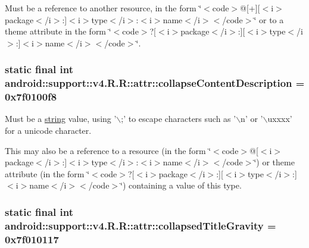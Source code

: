Must be a reference to another resource, in the form \char`\"{}$<$code$>$@\mbox{[}+\mbox{]}\mbox{[}$<$i$>$package$<$/i$>$:\mbox{]}$<$i$>$type$<$/i$>$:$<$i$>$name$<$/i$>$$<$/code$>$\char`\"{} or to a theme attribute in the form \char`\"{}$<$code$>$?\mbox{[}$<$i$>$package$<$/i$>$:\mbox{]}\mbox{[}$<$i$>$type$<$/i$>$:\mbox{]}$<$i$>$name$<$/i$>$$<$/code$>$\char`\"{}. \hypertarget{classandroid_1_1support_1_1v4_1_1_r_1_1attr_1a12539605c158306b97b48f25f27a3f}{
\subsubsection[{collapseContentDescription}]{\setlength{\rightskip}{0pt plus 5cm}static final int android::support::v4.R.R::attr::collapseContentDescription = 0x7f0100f8}}
\label{classandroid_1_1support_1_1v4_1_1_r_1_1attr_1a12539605c158306b97b48f25f27a3f}


Must be a \hyperlink{classandroid_1_1support_1_1v4_1_1_r_1_1string}{string} value, using '$\backslash$;' to escape characters such as '$\backslash$n' or '$\backslash$uxxxx' for a unicode character. 

This may also be a reference to a resource (in the form \char`\"{}$<$code$>$@\mbox{[}$<$i$>$package$<$/i$>$:\mbox{]}$<$i$>$type$<$/i$>$:$<$i$>$name$<$/i$>$$<$/code$>$\char`\"{}) or theme attribute (in the form \char`\"{}$<$code$>$?\mbox{[}$<$i$>$package$<$/i$>$:\mbox{]}\mbox{[}$<$i$>$type$<$/i$>$:\mbox{]}$<$i$>$name$<$/i$>$$<$/code$>$\char`\"{}) containing a value of this type. \hypertarget{classandroid_1_1support_1_1v4_1_1_r_1_1attr_a9bb8eca8c589c14b1cd3d702b6d9a61}{
\subsubsection[{collapsedTitleGravity}]{\setlength{\rightskip}{0pt plus 5cm}static final int android::support::v4.R.R::attr::collapsedTitleGravity = 0x7f010117}}
\label{classandroid_1_1support_1_1v4_1_1_r_1_1attr_a9bb8eca8c589c14b1cd3d702b6d9a61}


